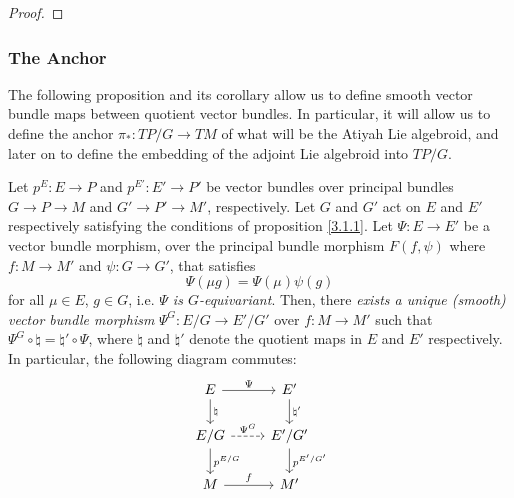 \begin{proof}
\end{proof}

\subsubsection{The Anchor}

The following proposition and its corollary allow us to define smooth vector bundle maps between quotient vector bundles. In particular, it will allow us to define the anchor $\pi_*:TP/G \to TM$ of what will be the Atiyah Lie algebroid, and later on to define the embedding of the adjoint Lie algebroid into $TP/G$.

\begin{proposition} \label{3.1.2}
Let $p^E: E \to P$ and $p^{E'}: E' \to P'$ be vector bundles over principal bundles $G \to P \to M$ and $G' \to P' \to M'$, respectively. Let $G$ and $G'$ act on $E$ and $E'$ respectively satisfying the conditions of proposition \ref{3.1.1}. Let $\Psi: E \to E'$ be a vector bundle morphism, over the principal bundle morphism $F(f, \psi)$ where $f:M\to M'$ and $\psi:G \to G'$, that satisfies \[\Psi(\mu g) = \Psi(\mu) \psi(g)\] for all $\mu \in E$, $g \in G$, i.e. \emph{$\Psi$ is $G$-equivariant}. Then, there \emph{exists a unique (smooth) vector bundle morphism} $\Psi^{G}: E/G \to E'/G'$ over $f: M \to M'$ such that $\Psi^{G} \circ \natural = \natural' \circ \Psi$, where $\natural$ and $\natural'$ denote the quotient maps in $E$ and $E'$ respectively. In particular, the following diagram commutes:
\begin{equation} \label{diagramQuotientMorph}
\begin{tikzcd}
    E   \ar{r}{\Psi}     \ar{d}{\natural} &   E'  \ar{d}{\natural'} \\
    E/G \ar[dashed]{r}{\Psi^{G}} \ar{d}{p^{E/G}}  & E'/G' \ar{d}{p^{E'/G'}} \\
    M \ar{r}{f} & M'
\end{tikzcd}
\end{equation}
\end{proposition}

